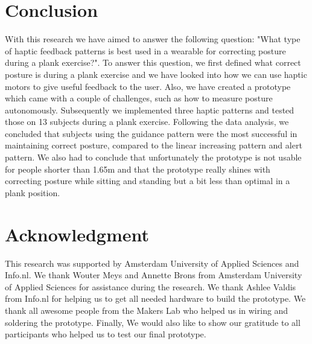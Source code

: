 \documentclass[sigconf]{acmart}
\begin{document}
\section{Conclusion}
With this research we have aimed to answer the following question: "What type of haptic feedback patterns is best used in a wearable for correcting posture during a plank exercise?". To answer this question, we first defined what correct posture is during a plank exercise and we have looked into how we can use haptic motors to give useful feedback to the user. Also, we have created a prototype which came with a couple of challenges, such as how to measure posture autonomously. Subsequently we implemented three haptic patterns and tested those on 13 subjects during a plank exercise. Following the data analysis, we concluded that subjects using the guidance pattern were the most successful in maintaining correct posture, compared to the linear increasing pattern and alert pattern. We also had to conclude that unfortunately the prototype is not usable for people shorter than 1.65m and that the prototype really shines with correcting posture while sitting and standing but a bit less than optimal in a plank position.

\section{Acknowledgment}
This research was supported by Amsterdam University of Applied Sciences and Info.nl. 
We thank Wouter Meys and Annette Brons from Amsterdam University of Applied Sciences for assistance during the research.
We thank Ashlee Valdis from Info.nl for helping us to get all needed hardware to build the prototype. 
We thank all awesome people from the Makers Lab who helped us in wiring and soldering the prototype. 
Finally, We would also like to show our gratitude to all participants who helped us to test our final prototype. 





\end{document}
